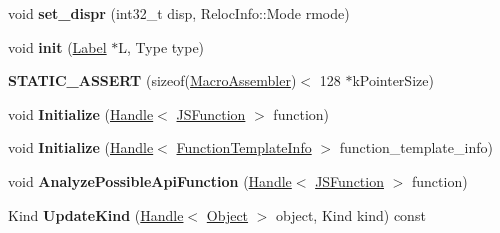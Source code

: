 \begin{DoxyCompactItemize}
\item 
void {\bfseries set\+\_\+dispr} (int32\+\_\+t disp, Reloc\+Info\+::\+Mode rmode)\hypertarget{classv8_1_1internal_1_1_b_a_s_e___e_m_b_e_d_d_e_d_af3b29cf41638f614847281aabf79ec02}{}\label{classv8_1_1internal_1_1_b_a_s_e___e_m_b_e_d_d_e_d_af3b29cf41638f614847281aabf79ec02}

\item 
void {\bfseries init} (\hyperlink{classv8_1_1internal_1_1_label}{Label} $\ast$L, Type type)\hypertarget{classv8_1_1internal_1_1_b_a_s_e___e_m_b_e_d_d_e_d_ad9a77389034280bce5cfa9f8a1c2b583}{}\label{classv8_1_1internal_1_1_b_a_s_e___e_m_b_e_d_d_e_d_ad9a77389034280bce5cfa9f8a1c2b583}

\item 
{\bfseries S\+T\+A\+T\+I\+C\+\_\+\+A\+S\+S\+E\+RT} (sizeof(\hyperlink{classv8_1_1internal_1_1_macro_assembler}{Macro\+Assembler})$<$ 128 $\ast$k\+Pointer\+Size)\hypertarget{classv8_1_1internal_1_1_b_a_s_e___e_m_b_e_d_d_e_d_aacb282ce4083eb5a3173ebc9b705b723}{}\label{classv8_1_1internal_1_1_b_a_s_e___e_m_b_e_d_d_e_d_aacb282ce4083eb5a3173ebc9b705b723}

\item 
void {\bfseries Initialize} (\hyperlink{classv8_1_1internal_1_1_handle}{Handle}$<$ \hyperlink{classv8_1_1internal_1_1_j_s_function}{J\+S\+Function} $>$ function)\hypertarget{classv8_1_1internal_1_1_b_a_s_e___e_m_b_e_d_d_e_d_ac40a04f2549cac9c002b00e5a29854a5}{}\label{classv8_1_1internal_1_1_b_a_s_e___e_m_b_e_d_d_e_d_ac40a04f2549cac9c002b00e5a29854a5}

\item 
void {\bfseries Initialize} (\hyperlink{classv8_1_1internal_1_1_handle}{Handle}$<$ \hyperlink{classv8_1_1internal_1_1_function_template_info}{Function\+Template\+Info} $>$ function\+\_\+template\+\_\+info)\hypertarget{classv8_1_1internal_1_1_b_a_s_e___e_m_b_e_d_d_e_d_a49e36ffc86aa9924bd15b21c3fcf51d8}{}\label{classv8_1_1internal_1_1_b_a_s_e___e_m_b_e_d_d_e_d_a49e36ffc86aa9924bd15b21c3fcf51d8}

\item 
void {\bfseries Analyze\+Possible\+Api\+Function} (\hyperlink{classv8_1_1internal_1_1_handle}{Handle}$<$ \hyperlink{classv8_1_1internal_1_1_j_s_function}{J\+S\+Function} $>$ function)\hypertarget{classv8_1_1internal_1_1_b_a_s_e___e_m_b_e_d_d_e_d_a156e59b11599c840dbffb961807b936b}{}\label{classv8_1_1internal_1_1_b_a_s_e___e_m_b_e_d_d_e_d_a156e59b11599c840dbffb961807b936b}

\item 
Kind {\bfseries Update\+Kind} (\hyperlink{classv8_1_1internal_1_1_handle}{Handle}$<$ \hyperlink{classv8_1_1internal_1_1_object}{Object} $>$ object, Kind kind) const \hypertarget{classv8_1_1internal_1_1_b_a_s_e___e_m_b_e_d_d_e_d_a17b87f485e57ab5d75e67dadae269966}{}\label{classv8_1_1internal_1_1_b_a_s_e___e_m_b_e_d_d_e_d_a17b87f485e57ab5d75e67dadae269966}


\end{DoxyCompactItemize}
